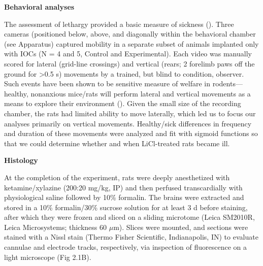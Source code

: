 \begin{refsection}
\smallskip
\noindent\textbf{Behavioral analyses}\par
\noindent 
The assessment of lethargy provided a basic measure of sickness (\cite{parker1982a,kent1992a}). Three cameras (positioned below, above, and diagonally within the behavioral chamber (see Apparatus) captured mobility in a separate subset of animals implanted only with IOCs (N = 4 and 5, Control and Experimental). Each video was manually scored for lateral (grid-line crossings) and vertical (rears; 2 forelimb paws off the ground for \textgreater0.5 s) movements by a trained, but blind to condition, observer. Such events have been shown to be sensitive measure of welfare in rodents—healthy, nonanxious mice/rats will perform lateral and vertical movements as a means to explore their environment (\cite{nachman1975a,cross-mellor2009a}). Given the small size of the recording chamber, the rats had limited ability to move laterally, which led us to focus our analyses primarily on vertical movements. Healthy/sick differences in frequency and duration of these movements were analyzed and fit with sigmoid functions so that we could determine whether and when LiCl-treated rats became ill.

\smallskip
\noindent\textbf{Histology}\par
\noindent 
At the completion of the experiment, rats were deeply anesthetized with ketamine/xylazine (200:20 mg/kg, IP) and then perfused transcardially with physiological saline followed by 10\% formalin. The brains were extracted and stored in a 10\% formalin/30\% sucrose solution for at least 3 d before staining, after which they were frozen and sliced on a sliding microtome (Leica SM2010R, Leica Microsystems; thickness 60 \(\mu\)m). Slices were mounted, and sections were stained with a Nissl stain (Thermo Fisher Scientific, Indianapolis, IN) to evaluate cannulae and electrode tracks, respectively, via inspection of fluorescence on a light microscope (Fig 2.1B).


\end{refsection}
